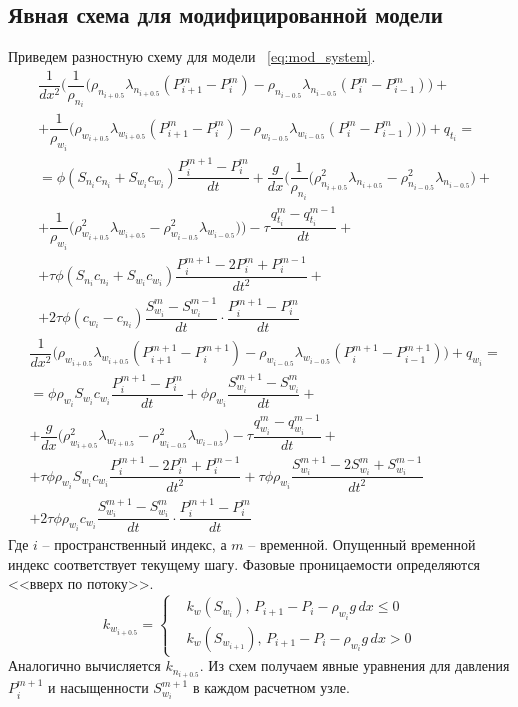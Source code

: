 \subsection{Явная схема для модифицированной модели}
\label{mod_model_explicit}
Приведем разностную схему для модели ~\ref{eq:mod_system}.
\begin{eqnarray*} \label{eq:mod_scheme_p}
  & \dfrac{1}{dx^2} \bigg(\dfrac{1}{\rho_{n_i}} \big( \rho_{n_{i+0.5}} \lambda_{n_{i+0.5}} (P_{i+1}^m - P_i^m)
  - \rho_{n_{i-0.5}} \lambda_{n_{i-0.5}} (P_i^m - P_{i-1}^m)\big) + \\
  &+ \dfrac{1}{\rho_{w_i}} \big( \rho_{w_{i+0.5}} \lambda_{w_{i+0.5}} (P_{i+1}^m - P_i^m)
  - \rho_{w_{i-0.5}} \lambda_{w_{i-0.5}} (P_i^m - P_{i-1}^m)\big)\bigg) + q_{t_i} = \\
  &= \phi(S_{n_i}c_{n_i}+S_{w_i}c_{w_i}) \dfrac{P_i^{m+1} - P_i^m}{dt}
  + \dfrac{g}{dx} \bigg(\dfrac{1}{\rho_{n_i}} \big( \rho_{n_{i+0.5}}^2 \lambda_{n_{i+0.5}} 
  - \rho_{n_{i-0.5}}^2 \lambda_{n_{i-0.5}} \big) + \\
  &+ \dfrac{1}{\rho_{w_i}} \big( \rho_{w_{i+0.5}}^2 \lambda_{w_{i+0.5}} 
  - \rho_{w_{i-0.5}}^2 \lambda_{w_{i-0.5}} \big)\bigg)
  - \tau \dfrac{q_{t_i}^m-q_{t_i}^{m-1}}{dt} + \\
  &+ \tau \phi (S_{n_i}c_{n_i}+S_{w_i}c_{w_i}) \dfrac{P_i^{m+1}-2P_i^m+P_i^{m-1}}{dt^2} +\\
  &+ 2 \tau \phi (c_{w_i}-c_{n_i}) \dfrac{S_{w_i}^m-S_{w_i}^{m-1}}{dt} \cdot \dfrac{P_i^{m+1}-P_i^m}{dt}
\end{eqnarray*}
\begin{eqnarray*} \label{eq:mod_scheme_p}
  & \dfrac{1}{dx^2} \bigg(\rho_{w_{i+0.5}} \lambda_{w_{i+0.5}} (P_{i+1}^{m+1} - P_i^{m+1})
  - \rho_{w_{i-0.5}} \lambda_{w_{i-0.5}} (P_i^{m+1} - P_{i-1}^{m+1}) \bigg) + q_{w_i} = \\
  &= \phi\rho_{w_i}S_{w_i}c_{w_i} \dfrac{P_i^{m+1} - P_i^m}{dt} + \phi\rho_{w_i} \dfrac{S_{w_i}^{m+1} - S_{w_i}^m}{dt} +\\ 
  &+ \dfrac{g}{dx} \bigg(\rho_{w_{i+0.5}}^2 \lambda_{w_{i+0.5}} - \rho_{w_{i-0.5}}^2 \lambda_{w_{i-0.5}} \bigg)
  - \tau \dfrac{q_{w_i}^m-q_{w_i}^{m-1}}{dt} + \\
  &+ \tau \phi \rho_{w_i}S_{w_i}c_{w_i} \dfrac{P_i^{m+1}-2P_i^m+P_i^{m-1}}{dt^2}
  + \tau \phi \rho_{w_i} \dfrac{S_{w_i}^{m+1}-2S_{w_i}^m+S_{w_i}^{m-1}}{dt^2} \\
  &+ 2 \tau \phi \rho_{w_i} c_{w_i} \dfrac{S_{w_i}^{m+1}-S_{w_i}^{m}}{dt} \cdot \dfrac{P_i^{m+1}-P_i^m}{dt}
\end{eqnarray*}
Где $i$ -- пространственный индекс, а $m$ -- временной. Опущенный временной индекс соответствует текущему шагу.
Фазовые проницаемости определяются <<вверх по потоку>>.
\begin{equation}
k_{w_{i+0.5}} =
 \begin{cases}
  &k_w(S_{w_i}),\, P_{i+1}-P_i-\rho_{w_i}g\,dx \le 0
  \\
  &k_w(S_{w_{i+1}}),\, P_{i+1}-P_i-\rho_{w_i}g\,dx > 0
 \end{cases}
\end{equation}
Аналогично вычисляется $k_{n_{i+0.5}}$.
Из схем получаем явные уравнения для давления $P_i^{m+1}$ и насыщенности $S_{w_i}^{m+1}$
в каждом расчетном узле. 


